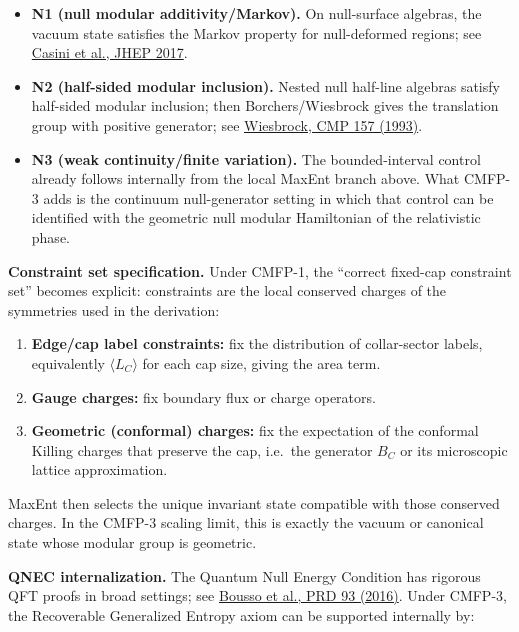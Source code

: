 \begin{itemize}
\item
\textbf{N1 (null modular additivity/Markov).} On null-surface algebras, the vacuum state satisfies the Markov property for null-deformed regions; see \href{https://arxiv.org/abs/1703.10656}{Casini et al., JHEP 2017}.
\item
\textbf{N2 (half-sided modular inclusion).} Nested null half-line algebras satisfy half-sided modular inclusion; then Borchers/Wiesbrock gives the translation group with positive generator; see \href{https://projecteuclid.org/journals/communications-in-mathematical-physics/volume-157/issue-1/Half-sided-modular-inclusions-of-von-Neumann-algebras/cmp/1104253848.pdf}{Wiesbrock, CMP 157 (1993)}.
\item
\textbf{N3 (weak continuity/finite variation).} The bounded-interval control already follows internally from the local MaxEnt branch above. What CMFP-3 adds is the continuum null-generator setting in which that control can be identified with the geometric null modular Hamiltonian of the relativistic phase.
\end{itemize}

\textbf{Constraint set specification.} Under CMFP-1, the ``correct fixed-cap constraint set'' becomes explicit: constraints are the local conserved charges of the symmetries used in the derivation:

\begin{enumerate}
\def\labelenumi{\arabic{enumi}.}
\item
\textbf{Edge/cap label constraints:} fix the distribution of collar-sector labels, equivalently \(\langle L_C \rangle\) for each cap size, giving the area term.
\item
\textbf{Gauge charges:} fix boundary flux or charge operators.
\item
\textbf{Geometric (conformal) charges:} fix the expectation of the conformal Killing charges that preserve the cap, i.e.\ the generator \(B_C\) or its microscopic lattice approximation.
\end{enumerate}

MaxEnt then selects the unique invariant state compatible with those conserved charges. In the CMFP-3 scaling limit, this is exactly the vacuum or canonical state whose modular group is geometric.

\textbf{QNEC internalization.} The Quantum Null Energy Condition has rigorous QFT proofs in broad settings; see \href{https://arxiv.org/abs/1509.02542}{Bousso et al., PRD 93 (2016)}. Under CMFP-3, the Recoverable Generalized Entropy axiom can be supported internally by:

